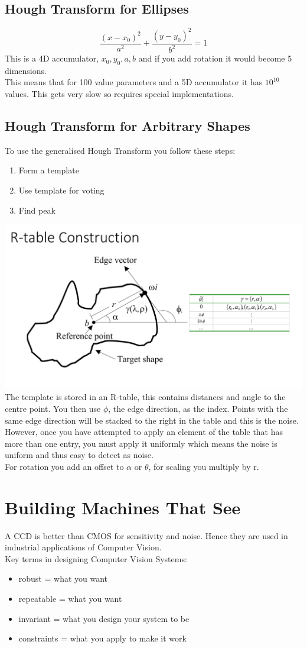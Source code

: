 \documentclass{article}
\begin{document}
	\subsection{Hough Transform for Ellipses}
	$$\frac{(x-x_0)^2}{a^2}+\frac{(y-y_0)^2}{b^2}=1$$
	This is a 4D accumulator, $x_0,y_0,a,b$ and if you add rotation it would become 5 dimensions.\\
	This means that for 100 value parameters and a 5D accumulator it has $10^{10}$ values. This gets very slow so requires special implementations.
	\subsection{Hough Transform for Arbitrary Shapes}
	To use the generalised Hough Transform you follow these steps:
	\begin{enumerate}
		\item Form a template
		\item Use template for voting
		\item Find peak
	\end{enumerate}
\includegraphics[scale=0.248]{rtableconstruct}
	The template is stored in an R-table, this contains distances and angle to the centre point. You then use $\phi$, the edge direction, as the index. Points with the same edge direction will be stacked to the right in the table and this is the noise. However, once you have attempted to apply an element of the table that has more than one entry, you must apply it uniformly which means the noise is uniform and thus easy to detect as noise.\\
	For rotation you add an offset to $\alpha$ or $\theta$, for scaling you multiply by r.
	
	\section{Building Machines That See}
	A CCD is better than CMOS for sensitivity and noise. Hence they are used in industrial applications of Computer Vision.\\
	Key terms in designing Computer Vision Systems:
	\begin{itemize}
		\item robust = what you want
		\item repeatable = what you want
		\item invariant = what you design your system to be
		\item constraints = what you apply to make it work
	\end{itemize}
\end{document}

